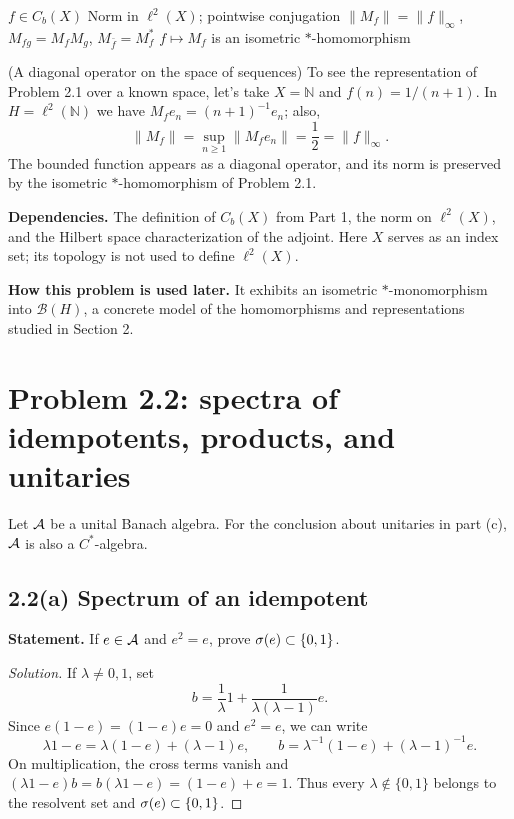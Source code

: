 \proofdiagram
{$f\in C_b(X)$}
{Norm in $\ell^2(X)$; pointwise conjugation}
{$\|M_f\|=\|f\|_\infty$, $M_{fg}=M_fM_g$, $M_{\bar f}=M_f^*$}
{$f\mapsto M_f$ is an isometric $*$-homomorphism}

\begin{cthejemplo}{(A diagonal operator on the space of sequences)}
To see the representation of Problem 2.1 over a known space, let's take $X=\mathbb N$ and
$f(n)=1/(n+1)$.
In $H=\ell^2(\mathbb N)$ we have $M_fe_n=(n+1)^{-1}e_n$; also,
\[
 \|M_f\|=\sup_{n\ge1}\|M_fe_n\|=\frac12=\|f\|_\infty.
\]
The bounded function appears as a diagonal operator, and its norm is preserved by
the isometric $*$-homomorphism of Problem 2.1.
\end{cthejemplo}

\noindent\textbf{Dependencies.} The definition of $C_b(X)$ from Part 1, the norm on $\ell^2(X)$, and the Hilbert space characterization of the adjoint. Here $X$ serves as an index set; its topology is not used to define $\ell^2(X)$.

\noindent\textbf{How this problem is used later.} It exhibits an isometric $*$-monomorphism into $\mathcal B(H)$, a concrete model of the homomorphisms and representations studied in Section 2.

\section{Problem 2.2: spectra of idempotents, products, and unitaries}

Let $\mathcal A$ be a unital Banach algebra. For the conclusion about unitaries in part (c), $\mathcal A$
is also a $C^*$-algebra.

\subsection*{2.2(a) Spectrum of an idempotent}

\noindent\textbf{Statement.} If $e\in\mathcal A$ and $e^2=e$, prove $\sigma(e)\subset\{0,1\}$.

\begin{proof}[Solution]
If $\lambda\neq0,1$, set
\[
 b=\frac1\lambda 1+\frac{1}{\lambda(\lambda-1)}e.
\]
Since $e(1-e)=(1-e)e=0$ and $e^2=e$, we can write
\[
 \lambda1-e=\lambda(1-e)+(\lambda-1)e,
 \qquad b=\lambda^{-1}(1-e)+(\lambda-1)^{-1}e.
\]
On multiplication, the cross terms vanish and
$(\lambda1-e)b=b(\lambda1-e)=(1-e)+e=1$. Thus every
$\lambda\notin\{0,1\}$ belongs to the resolvent set and
$\sigma(e)\subset\{0,1\}$.
\end{proof}

